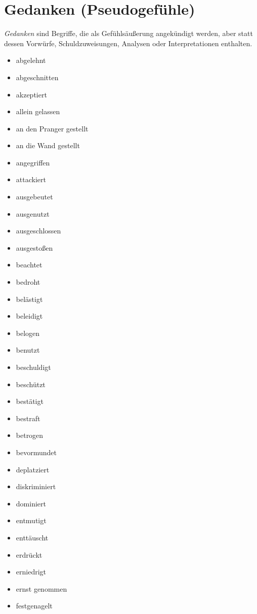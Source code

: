 \section{Gedanken (\glqq Pseudogefühle\grqq)}

\emph{Gedanken} sind Begriffe, die als Gefühlsäußerung angekündigt werden, aber statt dessen Vorwürfe, Schuldzuweisungen, Analysen oder Interpretationen enthalten.

\begin{multicols}{2}
  \begin{itemize}
    \item abgelehnt
    \item abgeschnitten
    \item akzeptiert
    \item allein gelassen
    \item an den Pranger gestellt
    \item an die Wand gestellt
    \item angegriffen
    \item attackiert
    \item ausgebeutet
    \item ausgenutzt
    \item ausgeschlossen
    \item ausgestoßen
    \item beachtet
    \item bedroht
    \item belästigt
    \item beleidigt
    \item belogen
    \item benutzt
    \item beschuldigt
    \item beschützt
    \item bestätigt
    \item bestraft
    \item betrogen
    \item bevormundet
    \item deplatziert
    \item diskriminiert
    \item dominiert
    \item entmutigt
    \item enttäuscht
    \item erdrückt
    \item erniedrigt
    \item ernst genommen
    \item festgenagelt

\end{itemize}
\end{multicols}
